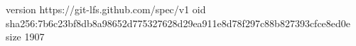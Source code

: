 version https://git-lfs.github.com/spec/v1
oid sha256:7b6c23bf8db8a98652d775327628d29ea911e8d78f297c88b827393cfce8ed0e
size 1907
